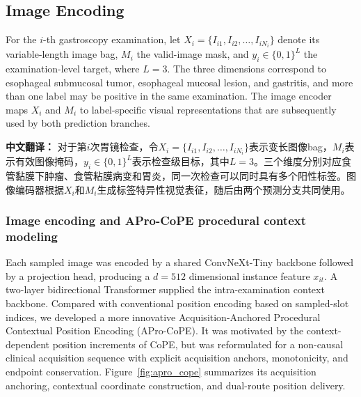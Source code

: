\documentclass[Afour,sagev,times]{sagej}
\begin{document}
\subsection{Image Encoding}

For the $i$-th gastroscopy examination, let $X_i=\{I_{i1},I_{i2},\ldots,I_{iN_i}\}$ denote its variable-length image bag, $M_i$ the valid-image mask, and $y_i\in\{0,1\}^{L}$ the examination-level target, where $L=3$. The three dimensions correspond to esophageal submucosal tumor, esophageal mucosal lesion, and gastritis, and more than one label may be positive in the same examination. The image encoder maps $X_i$ and $M_i$ to label-specific visual representations that are subsequently used by both prediction branches.

\textbf{中文翻译：} 对于第$i$次胃镜检查，令$X_i=\{I_{i1},I_{i2},\ldots,I_{iN_i}\}$表示变长图像bag，$M_i$表示有效图像掩码，$y_i\in\{0,1\}^{L}$表示检查级目标，其中$L=3$。三个维度分别对应食管黏膜下肿瘤、食管粘膜病变和胃炎，同一次检查可以同时具有多个阳性标签。图像编码器根据$X_i$和$M_i$生成标签特异性视觉表征，随后由两个预测分支共同使用。

\subsubsection{Image encoding and APro-CoPE procedural context modeling}

Each sampled image was encoded by a shared ConvNeXt-Tiny backbone followed by a projection head, producing a $d=512$ dimensional instance feature $x_{it}$.\cite{R28} A two-layer bidirectional Transformer supplied the intra-examination context backbone. Compared with conventional position encoding based on sampled-slot indices, we developed a more innovative Acquisition-Anchored Procedural Contextual Position Encoding (APro-CoPE). It was motivated by the context-dependent position increments of CoPE, but was reformulated for a non-causal clinical acquisition sequence with explicit acquisition anchors, monotonicity, and endpoint conservation. Figure~\ref{fig:apro_cope} summarizes its acquisition anchoring, contextual coordinate construction, and dual-route position delivery.
\end{document}

